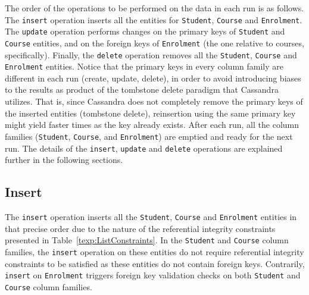 		
The order of the operations to be performed on the data in each run is as
follows.
The \texttt{insert} operation inserts all the entities for \texttt{Student},
\texttt{Course} and \texttt{Enrolment}. The  \texttt{update} operation performs
changes on the primary keys of \texttt{Student} and \texttt{Course} entities, 
and on the foreign keys of \texttt{Enrolment} (the one relative to courses, 
specifically).  Finally, the \texttt{delete} operation removes all the
\texttt{Student}, \texttt{Course} and \texttt{Enrolment} entities.
Notice that the primary keys in every column family are different in each run
(create,  update,  delete), in order to avoid introducing biases to the results
as product of the tombstone delete paradigm that Cassandra utilizes.  That is,
since Cassandra does not completely  remove the primary keys of the inserted
entities (tombstone delete),  reinsertion  using the same primary key might
yield faster times as the key already exists.  After each run,  all the column
families (\texttt{Student},  \texttt{Course},  and \texttt{Enrolment}) are
emptied and ready for the next run.   The details  of the \texttt{insert},
\texttt{update} and \texttt{delete} operations are explained further in the
following sections.
		

	
\subsection{Insert}
The \texttt{insert} operation  inserts all the \texttt{Student}, 
\texttt{Course} and \texttt{Enrolment} entities in that precise order due to the
nature of the referential integrity constraints presented in
Table~\ref{texp:ListConstraints}.   In the \texttt{Student} and
 \texttt{Course} column families,  the \texttt{insert}  operation on these
 entities do not require referential integrity constraints to be satisfied as these
 entities do not contain foreign keys.
 Contrarily,  \texttt{insert} on \texttt{Enrolment} triggers foreign key
 validation checks on both \texttt{Student} and \texttt{Course} column families.
		 
